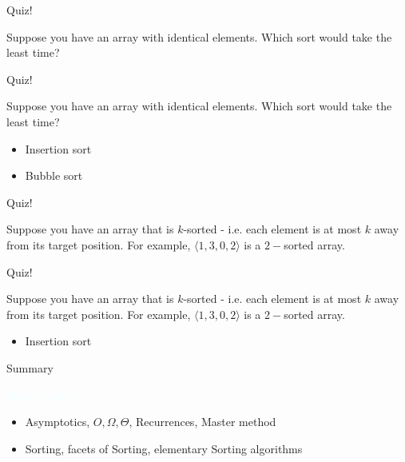 \documentclass{beamer}
\newcommand{\tblue}[1]{{\Large {\textcolor{azure}{#1}}}}
\begin{document}
\begin{frame}{Quiz!}

Suppose you have an array with identical elements. Which sort would take the least time?
\end{frame}


\begin{frame}{Quiz!}

Suppose you have an array with identical elements. Which sort would take the least time?
\begin{itemize}
\item Insertion sort
\item Bubble sort
\end{itemize}
\end{frame}


\begin{frame}{Quiz!}

Suppose you have an array that is $k$-sorted - i.e. each element is at most $k$ away from its target position.
For example, $\langle 1 , 3, 0, 2 \rangle$ is a $2-$sorted array.
\end{frame}


\begin{frame}{Quiz!}

Suppose you have an array that is $k$-sorted - i.e. each element is at most $k$ away from its target position.
For example, $\langle 1 , 3, 0, 2 \rangle$ is a $2-$sorted array.
\begin{itemize}
\item Insertion sort
\end{itemize}
\end{frame}


\begin{frame}{Summary}

\tblue{Major Topics:}
\begin{itemize}
\item Asymptotics,  $O, \Omega, \Theta$, Recurrences, Master method
\item Sorting, facets of Sorting, elementary Sorting algorithms
\end{itemize}
\end{frame}
\end{document}
